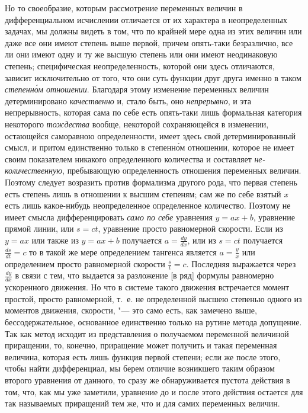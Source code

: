 \label{bkm:bm53c}Но то своеобразие, которым рассмотрение переменных величин в дифференциальном
исчислении отличается от их характера в неопределенных задачах, мы должны
видеть в том, что по крайней мере одна из этих величин или даже все они
имеют степень выше первой, причем опять-таки безразлично, все ли они имеют
одну и ту же высшую степень или они имеют неодинаковую степень;
специфическая неопределенность, которой они здесь отличаются, зависит
исключительно от того, что они суть функции друг друга именно в таком
{\em степенн\'{о}м отношении}. Благодаря этому изменение
переменных величин детерминировано {\em качественно} и,
стало быть, оно {\em непрерывно}, и эта непрерывность,
которая сама по себе есть опять-таки лишь формальная категория некоторого
{\em тождества} вообще, некоторой сохраняющейся в
изменении, остающейся саморавною определенности, имеет здесь свой
детерминированный смысл, и притом единственно только в степенн\'{о}м отношении,
которое не имеет своим показателем никакого определенного количества и
составляет {\em не-количественную}, пребывающую
определенность отношения переменных величин. Поэтому следует возразить
против формализма другого рода, что первая степень есть степень лишь в
отношении к высшим степеням; сам же по себе взятый
{\em x} есть лишь какое-нибудь неопределенное
определенное количество. Поэтому не имеет смысла дифференцировать
{\em само по себе} уравнения $y=ax+b$,
уравнение прямой линии, или $s=ct$, уравнение просто равномерной
скорости. Если из $y=ax$ или также из $y=ax+b$
получается $a=\frac{dy}{dx}$, или из $s=ct$
получается $\frac{ds}{dt}=c$ то в такой же мере
определением тангенса является $a=\frac y x$ или определением просто
равномерной скорости $\frac s t=c$. Последняя выражается через
$\frac{dy}{dx}$ в связи с тем, что выдается за
разложение [в ряд] формулы равномерно ускоренного движения. Но что в
системе такого движения встречается момент простой, просто
равномерной, т.~е. не определенной высшею степенью одного из моментов
движения, скорости, "--- это само есть, как замечено выше, бессодержательное,
основанное единственно только на рутине метода допущение. Так как метод
исходит из представления о получаемом переменной величиной приращении, то,
конечно, приращение может получить и такая переменная величина, которая
есть лишь функция первой степени; если же после этого, чтобы найти
дифференциал, мы берем отличие возникшего таким образом второго уравнения от
данного, то сразу же обнаруживается пустота действия в том, что, как мы уже
заметили, уравнение до и после этого действия остается для так называемых
приращений тем же, что и для самих переменных величин.

